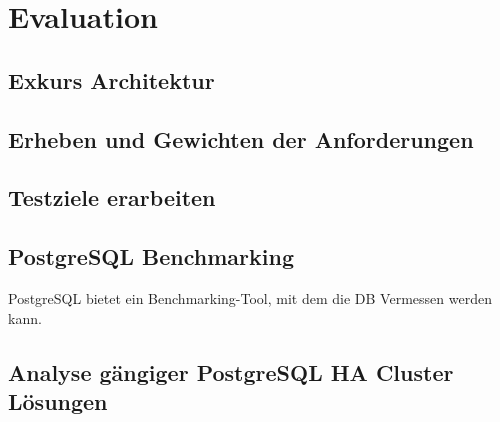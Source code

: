 
\section{Evaluation}
\subsection{Exkurs Architektur}






\subsection{Erheben und Gewichten der Anforderungen}

\subsection{Testziele erarbeiten}
\subsection{PostgreSQL Benchmarking}
PostgreSQL bietet ein Benchmarking-Tool,\cite{TYJFF7AB,VXNYQFTE} mit dem die DB Vermessen werden kann.
\subsection{Analyse gängiger PostgreSQL HA Cluster Lösungen}









